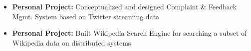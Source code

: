 \documentclass[a4paper,10pt]{article}
\newcommand{\lsep}{-0.5cm}
\newcommand{\resheading}[1]{{\small
        {
            \begin{minipage}
                {0.992\textwidth}\textbf{{\textsc{#1 \vphantom{p\^{E}} }}}
                \\[-0.3cm]
                \hrule
            \end{minipage}
            \\[-0.5cm]
        }
 }}
\begin{document}
\begin{itemize}


\item \textbf{Personal Project:} Conceptualized and designed Complaint \& Feedback Mgmt. System based on Twitter streaming data
\\ [-0.6cm]

\item \textbf{Personal Project:} Built Wikipedia Search Engine for searching a subset of Wikipedia data on distributed systems 
\\ [-0.5cm]
\end{itemize}


\end{document}
